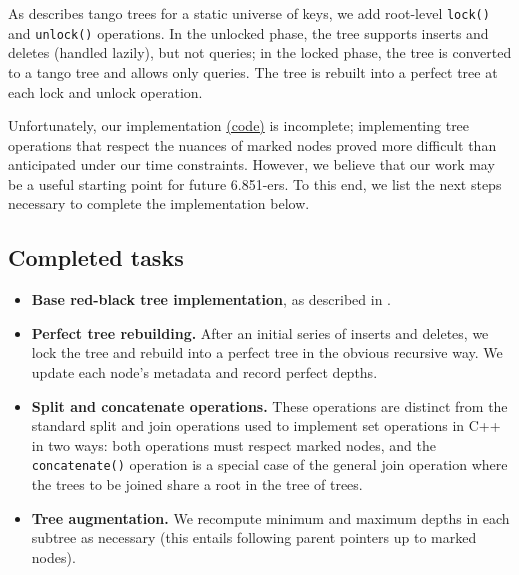 \documentclass{article}
\begin{document}
As \cite{demaine2007dynamic} describes tango trees for a static universe of keys, we add root-level \texttt{lock()} and \texttt{unlock()} operations. In the unlocked phase, the tree supports inserts and deletes (handled lazily), but not queries; in the locked phase, the tree is converted to a tango tree and allows only queries. The tree is rebuilt into a perfect tree at each lock and unlock operation.

Unfortunately, our implementation \href{https://github.com/6851-2021/tango-trees/blob/master/src/rb.hpp}{(code)} is incomplete; implementing tree operations that respect the nuances of marked nodes proved more difficult than anticipated under our time constraints. However, we believe that our work may be a useful starting point for future 6.851-ers. To this end, we list the next steps necessary to complete the implementation below.

\subsection{Completed tasks}
\begin{itemize}
    \item \textbf{Base red-black tree implementation}, as described in \cite{cormen2009introduction}.
    \item \textbf{Perfect tree rebuilding.} After an initial series of inserts and deletes, we lock the tree and rebuild into a perfect tree in the obvious recursive way. We update each node's metadata and record perfect depths.
    \item \textbf{Split and concatenate operations.} These operations are distinct from the standard split and join operations used to implement set operations in C++ in two ways: both operations must respect marked nodes, and the \texttt{concatenate()} operation is a special case of the general join operation where the trees to be joined share a root in the tree of trees.
    \item \textbf{Tree augmentation.} We recompute minimum and maximum depths in each subtree as necessary (this entails following parent pointers up to marked nodes). 
\end{itemize}
\end{document}
